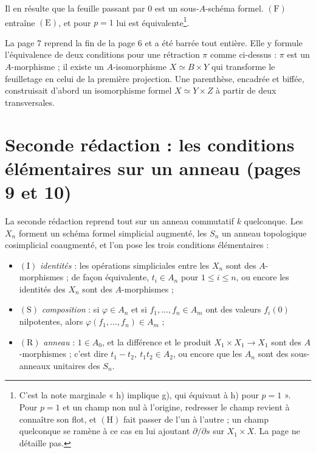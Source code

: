 \documentclass[11pt,a4paper]{article}
\begin{document}
Il en résulte que la feuille passant par $0$ est un sous-$A$-schéma formel.
$(\mathrm{F})$ entraîne $(\mathrm{E})$, et pour $p = 1$ lui est
équivalente\footnote{C'est la note marginale « h) implique g), qui équivaut
à h) pour $p = 1$ ». Pour $p = 1$ et un champ non nul à l'origine, redresser
le champ revient à connaître son flot, et $(\mathrm{H})$ fait passer de l'un à
l'autre ; un champ quelconque se ramène à ce cas en lui ajoutant
$\partial/\partial s$ sur $X_1 \times X$. La page ne détaille pas.}.

La page 7 reprend la fin de la page 6 et a été barrée tout entière. Elle y
formule l'équivalence de deux conditions pour une rétraction $\pi$ comme
ci-dessus : $\pi$ est un $A$-morphisme ; il existe un $A$-isomorphisme
$X \simeq B \times Y$ qui transforme le feuilletage en celui de la première
projection. Une parenthèse, encadrée et biffée, construisait d'abord un
isomorphisme formel $X \simeq Y \times Z$ à partir de deux transversales.

\section*{Seconde rédaction : les conditions élémentaires sur un anneau (pages 9 et 10)}

La seconde rédaction reprend tout sur un anneau commutatif $k$ quelconque. Les
$X_n$ forment un schéma formel simplicial augmenté, les $S_n$ un anneau
topologique cosimplicial coaugmenté, et l'on pose les trois conditions
élémentaires :

\begin{itemize}
  \item $(\mathrm{I})$ \emph{identités} : les opérations simpliciales entre les
    $X_n$ sont des $A$-morphismes ; de façon équivalente, $t_i \in A_n$ pour
    $1 \leq i \leq n$, ou encore les identités des $X_n$ sont des $A$-morphismes ;
  \item $(\mathrm{S})$ \emph{composition} : si $\varphi \in A_n$ et si
    $f_1, \ldots, f_n \in A_m$ ont des valeurs $f_i(0)$ nilpotentes, alors
    $\varphi(f_1, \ldots, f_n) \in A_m$ ;
  \item $(\mathrm{R})$ \emph{anneau} : $1 \in A_0$, et la différence et le
    produit $X_1 \times X_1 \to X_1$ sont des $A$-morphismes ; c'est dire
    $t_1 - t_2,\ t_1 t_2 \in A_2$, ou encore que les $A_n$ sont des
    sous-anneaux unitaires des $S_n$.
\end{itemize}
\end{document}
